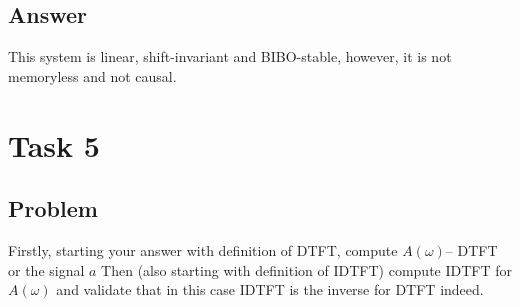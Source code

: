 \documentclass{article}
\begin{document}
    \subsection{Answer}
    This system is linear, shift-invariant and BIBO-stable, however, it is not memoryless and not causal.

\section{Task 5}
\subsection{Problem}
Firstly, starting your answer with definition of DTFT, compute $A(\omega)$– DTFT or the signal $a$ Then (also starting with definition of IDTFT) compute IDTFT for $A(\omega)$ and validate that in this case IDTFT is the inverse for DTFT indeed.
\end{document}
